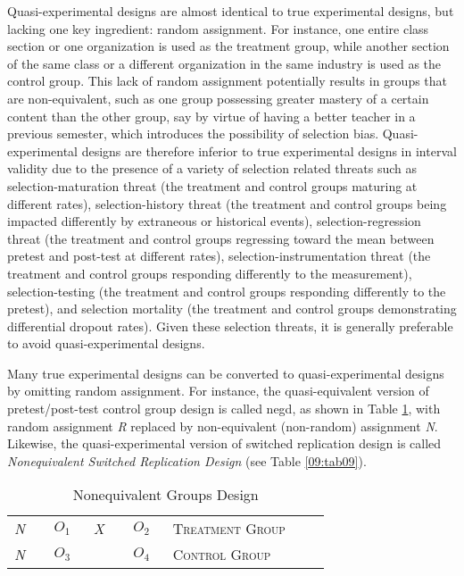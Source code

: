 Quasi-experimental designs are almost identical to true experimental designs, but lacking one key ingredient: random assignment. For instance, one entire class section or one organization is used as the treatment group, while another section of the same class or a different organization in the same industry is used as the control group. This lack of random assignment potentially results in groups that are non-equivalent, such as one group possessing greater mastery of a certain content than the other group, say by virtue of having a better teacher in a previous semester, which introduces the possibility of selection bias. Quasi-experimental designs are therefore inferior to true experimental designs in interval validity due to the presence of a variety of selection related threats such as selection-maturation threat (the treatment and control groups maturing at different rates), selection-history threat (the treatment and control groups being impacted differently by extraneous or historical events), selection-regression threat (the treatment and control groups regressing toward the mean between pretest and post-test at different rates), selection-instrumentation threat (the treatment and control groups responding differently to the measurement), selection-testing (the treatment and control groups responding differently to the pretest), and selection mortality (the treatment and control groups demonstrating differential dropout rates). Given these selection threats, it is generally preferable to avoid quasi-experimental designs.

Many true experimental designs can be converted to quasi-experimental designs by omitting random assignment. For instance, the quasi-equivalent version of pretest/post-test control group design is called \gls{negd}, as shown in Table \ref{09:tab08}, with random assignment \textit{R} replaced by non-equivalent (non-random) assignment \textit{N}. Likewise, the quasi-experimental version of switched replication design is called \textit{Nonequivalent Switched Replication Design} (see Table \ref{09:tab09}).

\begin{table}[H]
	\centering
	\begin{tabularx}{0.85\linewidth}{p{0.10\linewidth}p{0.10\linewidth}p{0.10\linewidth}p{0.10\linewidth}p{0.40\linewidth}}
		\toprule
		\textit{N} & $ O_1 $ & \textit{X} & $ O_2 $ & \textsc{Treatment Group} \\
		\textit{N} & $ O_3 $ &            & $ O_4 $ & \textsc{Control Group} \\
		\bottomrule
	\end{tabularx}
	\caption{Nonequivalent Groups Design}
	\label{09:tab08}
\end{table}


